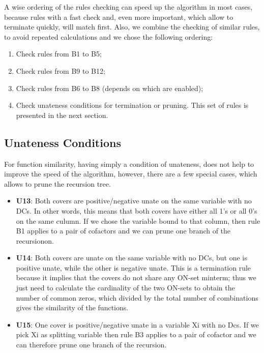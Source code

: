 \documentclass{acm_proc_article-sp}
\begin{document}
A wise ordering of the rules checking can speed up the algorithm in most cases,
because rules with a fast check and, even more important, which allow to terminate
quickly, will match first. Also, we combine the checking of similar rules, to
avoid repeated calculations and we chose the following ordering:
\begin{enumerate}
  \item Check rules from B1 to B5;
  \item Check rules from B9 to B12;
  \item Check rules from B6 to B8 (depends on which are enabled);
  \item Check unateness conditions for termination or pruning. This set of rules
    is presented in the next section.
\end{enumerate}

\subsection{Unateness Conditions}

For function similarity, having simply a condition of unateness, does not help to
improve the speed of the algorithm, however, there are a few special cases, which
allows to prune the recursion tree.

\begin{itemize}
  \item {\bf U13}: Both covers are positive/negative unate on the same variable with
    no DCs. In other words, this means that both covers have either all 1's or all
    0's on the same culumn. If we chose the variable bound to that column, then
    rule B1 applies to a pair of cofactors and we can prune one branch of the
    recursionon.
  \item {\bf U14}: Both covers are unate on the same variable with no DCs, but one
    is positive unate, while the other is negative unate. This is a termination rule
    because it implies that the covers do not share any ON-set minterm; thus we just
    need to calculate the cardinality of the two ON-sets to obtain the number of
    common zeros, which divided by the total number of combinations gives the
    similarity of the functions.
  \item {\bf U15}: One cover is positive/negative unate in a variable Xi with no Dcs.
    If we pick Xi as splitting variable then rule B3 applies to a pair of cofactor
    and we can therefore prune one branch of the recursion.
\end{itemize}
\end{document}

